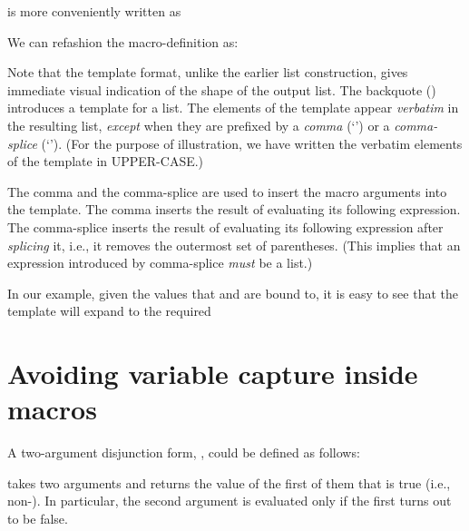 
\n is more conveniently written as


\n We can refashion the  macro-definition as:


\n Note that the template format, unlike the earlier
list construction, gives immediate visual indication of
the shape of the output list.  The backquote ()
introduces a template for a list.  The elements of the
template appear {\em verbatim} in the resulting list,
{\em except} when they are prefixed by a {\em comma}
(‘\q{,}’) or a {\em comma-splice} (‘’).  (For the
purpose of illustration, we have written the verbatim
elements of the template in UPPER-CASE.)

The comma and the comma-splice are used to insert the
macro arguments into the template.  The comma inserts
the result of evaluating its following expression.  The
comma-splice inserts the result of evaluating its
following expression after {\em splicing} it, i.e., it
removes the outermost set of parentheses.  (This
implies that an expression introduced by comma-splice
{\em must} be a list.)

In our example, given the values that  and
 are bound to, it is easy to see that the
template will expand to the required


\section{Avoiding variable capture inside macros}

A two-argument disjunction form, , could be
defined as follows:


\n 
{} takes two arguments and returns the value of
the first of them that is true (i.e., non-).  In
particular, the second argument is evaluated only if
the first turns out to be false.


